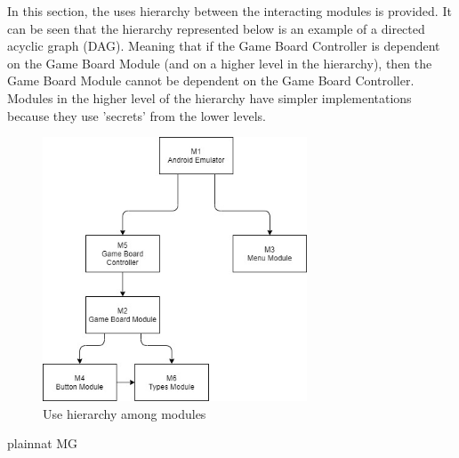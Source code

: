 \documentclass[12pt, titlepage]{article}
\begin{document}
In this section, the uses hierarchy between the interacting modules is
provided. It can be seen that the hierarchy represented below is an example of a directed acyclic graph
(DAG). Meaning that if the Game Board Controller is dependent on the Game Board Module (and on a higher level in the hierarchy), then the Game Board Module cannot be dependent on the Game Board Controller. Modules in the higher level of the hierarchy have simpler implementations
because they use 'secrets' from the lower levels.

\begin{figure}[H]
\centering
\includegraphics[width=0.7\textwidth]{module_hierarchy.jpg}
\caption{Use hierarchy among modules}
\label{FigUH}
\end{figure}


 {plainnat}
 {MG}
\end{document}
